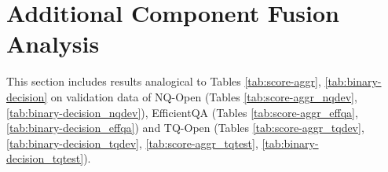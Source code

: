 \documentclass[11pt,a4paper]{article}
\begin{document}
\section{Additional Component Fusion Analysis}
\label{app:additional_comp_fusion}
This section includes results analogical to Tables \ref{tab:score-aggr}, \ref{tab:binary-decision} on validation data of NQ-Open (Tables \ref{tab:score-aggr_nqdev}, \ref{tab:binary-decision_nqdev}), EfficientQA (Tables \ref{tab:score-aggr_effqa}, \ref{tab:binary-decision_effqa}) and TQ-Open (Tables \ref{tab:score-aggr_tqdev}, \ref{tab:binary-decision_tqdev}, \ref{tab:score-aggr_tqtest}, \ref{tab:binary-decision_tqtest}).
\begin{table}[H]
    \centering
    \caption{Score aggregation -- NQ-Open (dev).}
    \label{tab:score-aggr_nqdev}
\end{table}
\begin{table}[H]
\vspace{-0.5cm}
    \centering
    \caption{Binary decision -- NQ-Open (dev).}
    \label{tab:binary-decision_nqdev}
\end{table}
\begin{table}[H]
\vspace{-0.5cm}
    \centering
    \caption{Score aggregation -- EfficientQA.}
    \label{tab:score-aggr_effqa}
\end{table}
\end{document}
